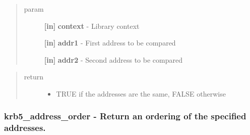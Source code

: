 \documentclass[letterpaper,10pt,english]{sphinxmanual}
\begin{document}
\begin{fulllineitems}
\label{appdev/refs/api/krb5_address_compare:c.krb5_address_compare}
\end{fulllineitems}

\begin{quote}\begin{description}
\item[{param}] \leavevmode
\textbf{{[}in{]}} \textbf{context} - Library context

\textbf{{[}in{]}} \textbf{addr1} - First address to be compared

\textbf{{[}in{]}} \textbf{addr2} - Second address to be compared

\end{description}\end{quote}
\begin{quote}\begin{description}
\item[{return}] \leavevmode\begin{itemize}
\item {} 
TRUE if the addresses are the same, FALSE otherwise

\end{itemize}

\end{description}\end{quote}


\subsubsection{krb5\_address\_order -  Return an ordering of the specified addresses.}
\label{appdev/refs/api/krb5_address_order:krb5-address-order-return-an-ordering-of-the-specified-addresses}\label{appdev/refs/api/krb5_address_order::doc}

\begin{fulllineitems}
\label{appdev/refs/api/krb5_address_order:c.krb5_address_order}
\end{fulllineitems}
\end{document}
